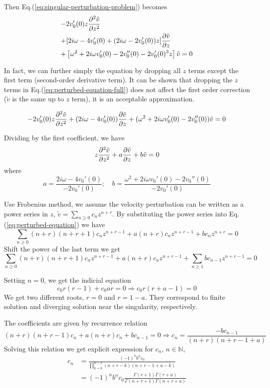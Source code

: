 Then Eq.(\ref{eq:singular-perturbation-problem}) becomes
\begin{equation} \label{eq:perturbed-equation-full}
	\begin{aligned}
		- & 2v_0'(0)z\pdv[2]{\tilde{v}}{z}                                              \\
		+ & [2i\omega - 4v_0'(0) + (2i\omega - 2v_0'(0))z]\pdv{\tilde{v}}{z}            \\
		+ & \left[\omega^2 + 2i\omega v_0'(0) - 2v_0''(0) - 2v_0'(0)^3z\right]\tilde{v}
		= 0
	\end{aligned}
\end{equation}

In fact, we can further simply the equation by dropping all $z$ terms except the first term (second-order derivative term). It can be shown that dropping the $z$ terms in Eq.(\ref{eq:perturbed-equation-full}) does not affect the first order correction ($\tilde{v}$ is the same up to $z$ term), it is an acceptable approximation.

\[ - 2v_0'(0)z\pdv[2]{\tilde{v}}{z}
	+ (2i\omega - 4v_0'(0))\pdv{\tilde{v}}{z}
	+ (\omega^2 + 2i\omega v_0'(0) - 2v_0''(0))\tilde{v}
	= 0 \]

Dividing by the first coefficient, we have
\begin{equation}
	z\pdv[2]{\tilde{v}}{z} + a\pdv{\tilde{v}}{z} + b\tilde{v} = 0
	\label{eq:perturbed-equation}
\end{equation}
where
\[ a = \frac{2i\omega - 4v_0'(0)}{-2v_0'(0)}; \quad
	b = \frac{\omega^2 + 2i\omega v_0'(0) - 2v_0''(0)}{-2v_0'(0)}
\]

Use Frobenius method, we assume the velocity perturbation can be written as a power series in $z$,  $\tilde{v} = \sum_{n\geq 0}c_nz^{n+r}$. By substituting the power series into Eq.(\ref{eq:perturbed-equation}) we have
\[ \sum_{n \geq 0} (n+r)(n+r+1) c_n z^{n+r-1} + a(n+r)c_nz^{n+r-1} + bc_nz^{n+r} = 0\]
Shift the power of the last term we get
\[ \sum_{n \geq 0} (n+r)(n+r+1) c_n z^{n+r-1} + a(n+r)c_nz^{n+r-1} + \sum_{n \geq 1} bc_{n-1}z^{n+r-1} = 0\]

Setting $n=0$, we get the indicial equation
\[ c_0 r(r-1) + c_0 ar = 0 \Rightarrow c_0r(r+a-1) = 0 \]
We get two different roots, $r=0$ and $r=1-a$. They correspond to finite solution and diverging solution near the singularity, respectively.

The coefficients are given by recurrence relation
\[ (n+r)(n+r-1)c_n + a(n+r)c_n + bc_{n-1} = 0
	\Rightarrow
	c_n = \frac{-bc_{n-1}}{(n+r)(n+r-1+a)}
\]
Solving this relation we get explicit expression for $c_n$, $n\in\mathbb{N}$,
\begin{equation}
	\begin{aligned}
		c_n & = \frac{(-1)^n b^n c_0}{\prod_{k=0}^{n-1} (n+r-k)(n+r-1+a-k)}              \\
		    & = (-1)^n b^n c_0 \frac{\Gamma(r+1)\Gamma(r+a)}{\Gamma(n+r+1)\Gamma(n+r+a)}
	\end{aligned}
	\label{eq:coefficient}
\end{equation}

